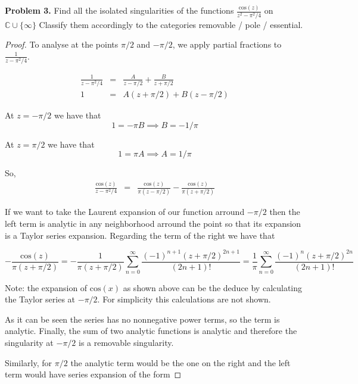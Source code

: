 \documentclass[letterpaper,twoside,11pt]{article}
\begin{document}
\textbf{Problem 3.} Find all the isolated singularities of the functions $\frac{\text{cos}(z)}{z^2-\pi^2/4}$ on $\mathbb{C} \cup \{\infty\}$
Classify them accordingly to the categories removable / pole / essential.
\begin{proof}

To analyse at the points $\pi/2$ and $-\pi/2$, we apply partial fractions to $\frac{1}{z-\pi^2/4}$.

\begin{eqnarray}
\frac{1}{z-\pi^2/4}&=&\frac{A}{z-\pi/2}+\frac{B}{z+\pi/2} \nonumber
\\ 1&=&A(z+\pi/2)+B(z-\pi/2) \nonumber
\end{eqnarray}

At $z=-\pi/2$ we have that
\begin{equation}
1=-\pi B \implies B=-1/\pi \nonumber
\end{equation} 

At $z=\pi/2$ we have that
\begin{equation}
1=\pi A \implies A=1/\pi \nonumber
\end{equation} 

So,
\begin{eqnarray}
\frac{\text{cos}(z)}{z-\pi^2/4}&=&\frac{\text{cos}(z)}{\pi(z-\pi/2)}-\frac{\text{cos}(z)}{\pi(z+\pi/2)} \nonumber
\end{eqnarray}

If we want to take the Laurent expansion of our function arround $-\pi/2$ then the left term is analytic in any neighborhood arround the point so that its expansion is a Taylor series expansion. Regarding the term of the right we have that

\begin{equation}
-\frac{\text{cos}(z)}{\pi(z+\pi/2)}= -\frac{1}{\pi(z+\pi/2)}\sum_{n=0}^{\infty}\frac{(-1)^{n+1}(z+\pi/2)^{2n+1}}{(2n+1)!}=\frac{1}{\pi}\sum_{n=0}^{\infty}\frac{(-1)^n(z+\pi/2)^{2n}}{(2n+1)!}\nonumber
\end{equation}

Note: the expansion of $\text{cos}(x)$ as shown above can be the deduce by calculating the Taylor series at $-\pi/2$. For simplicity this calculations are not shown.

As it can be seen the series has no nonnegative power terms, so the term is analytic. Finally, the sum of two analytic functions is analytic and therefore the singularity at $-\pi/2$ is a removable singularity.

Similarly, for $\pi/2$ the analytic term would be the one on the right and the left term would have series expansion of the form


\end{proof}
\end{document}
